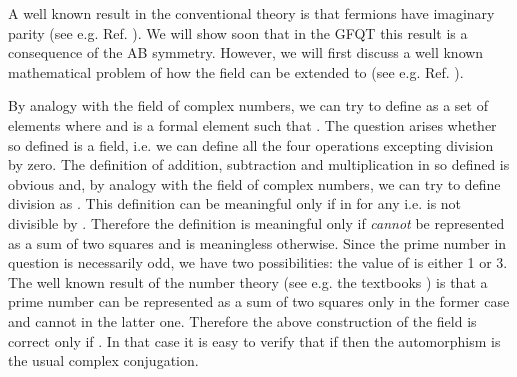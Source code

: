 \documentclass[a4paper,12pt]{article}%
\begin{document}
A well known result in the conventional theory is that
fermions have imaginary parity (see e.g. Ref. 
\cite{Wein-super}). We will show soon that in 
the GFQT this result is a consequence of the AB symmetry. 
However, we will first discuss a well known mathematical
problem of how the field \coordHE{} can be extended to 
\coordHE{} (see e.g. Ref. \cite{VDW}).

By analogy with the field of complex numbers, we can 
try to define \coordHE{} as a set 
of \coordHE{} elements \coordHE{} where \coordHE{} and \coordHE{} is a 
formal element such that \coordHE{}. The question arises whether 
so defined \coordHE{} is a field, i.e. we can define all the 
four operations excepting division by zero.
The definition of addition, subtraction and multiplication 
in so defined \coordHE{} is obvious and, by analogy with the 
field of complex numbers, we can
try to define division as \coordHE{}.
This definition can be meaningful only if \coordHE{} in \coordHE{}
for any \coordHE{} i.e. \coordHE{} is not divisible by \coordHE{}.
Therefore the definition is meaningful only if \coordHE{} {\it cannot}
be represented as a sum of two squares and is meaningless otherwise.
Since the prime number \coordHE{} in question is necessarily odd, we
have two possibilities: the value of \coordHE{} is either 1
or 3. The well known result of the number theory (see e.g. the 
textbooks \cite{VDW}) is that a prime number \coordHE{} can be 
represented as a sum of two squares only in the former case
and cannot in the latter one. Therefore the above construction of
the field \coordHE{} is correct only if \coordHE{}.
In that case it is easy to verify that if \coordHE{} then the
automorphism \coordHE{} is the usual complex
conjugation.
\end{document}
